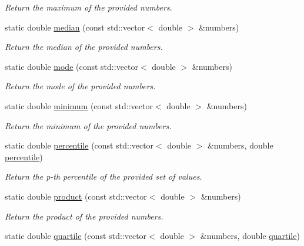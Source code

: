 \begin{DoxyCompactItemize}
\begin{DoxyCompactList}\small\item\em \-Return the maximum of the provided numbers. \end{DoxyCompactList}\item 
static double \hyperlink{classmultiscale_1_1Numeric_a254f9df60a269739a1bfd5e7c383aed2}{median} (const std\-::vector$<$ double $>$ \&numbers)
\begin{DoxyCompactList}\small\item\em \-Return the median of the provided numbers. \end{DoxyCompactList}\item 
static double \hyperlink{classmultiscale_1_1Numeric_a09dc6e20116ac163389d3b07a99618e1}{mode} (const std\-::vector$<$ double $>$ \&numbers)
\begin{DoxyCompactList}\small\item\em \-Return the mode of the provided numbers. \end{DoxyCompactList}\item 
static double \hyperlink{classmultiscale_1_1Numeric_a1ba7305dcaa1d1baf17946beb233145d}{minimum} (const std\-::vector$<$ double $>$ \&numbers)
\begin{DoxyCompactList}\small\item\em \-Return the minimum of the provided numbers. \end{DoxyCompactList}\item 
static double \hyperlink{classmultiscale_1_1Numeric_aff0c6b0c3d82bec3761a5e2d08394513}{percentile} (const std\-::vector$<$ double $>$ \&numbers, double \hyperlink{classmultiscale_1_1Numeric_aff0c6b0c3d82bec3761a5e2d08394513}{percentile})
\begin{DoxyCompactList}\small\item\em \-Return the p-\/th percentile of the provided set of values. \end{DoxyCompactList}\item 
static double \hyperlink{classmultiscale_1_1Numeric_af07966e00665420d17a8f4d2cd1d74b4}{product} (const std\-::vector$<$ double $>$ \&numbers)
\begin{DoxyCompactList}\small\item\em \-Return the product of the provided numbers. \end{DoxyCompactList}\item 
static double \hyperlink{classmultiscale_1_1Numeric_a127a2b3e5e659b4e493767ba23fc45da}{quartile} (const std\-::vector$<$ double $>$ \&numbers, double \hyperlink{classmultiscale_1_1Numeric_a127a2b3e5e659b4e493767ba23fc45da}{quartile})

\end{DoxyCompactItemize}
